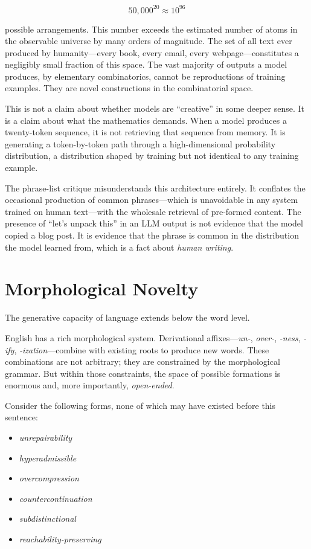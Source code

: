 \documentclass[12pt]{article}
\begin{document}
\[
50{,}000^{20} \approx 10^{96}
\]

\noindent possible arrangements. This number exceeds the estimated number of atoms in the observable universe by many orders of magnitude. The set of all text ever produced by humanity---every book, every email, every webpage---constitutes a negligibly small fraction of this space. The vast majority of outputs a model produces, by elementary combinatorics, cannot be reproductions of training examples. They are novel constructions in the combinatorial space.

This is not a claim about whether models are ``creative'' in some deeper sense. It is a claim about what the mathematics demands. When a model produces a twenty-token sequence, it is not retrieving that sequence from memory. It is generating a token-by-token path through a high-dimensional probability distribution, a distribution shaped by training but not identical to any training example.

The phrase-list critique misunderstands this architecture entirely. It conflates the occasional production of common phrases---which is unavoidable in any system trained on human text---with the wholesale retrieval of pre-formed content. The presence of ``let's unpack this'' in an LLM output is not evidence that the model copied a blog post. It is evidence that the phrase is common in the distribution the model learned from, which is a fact about \emph{human writing}.

\section{Morphological Novelty}

The generative capacity of language extends below the word level.

English has a rich morphological system. Derivational affixes---\textit{un-}, \textit{over-}, \textit{-ness}, \textit{-ify}, \textit{-ization}---combine with existing roots to produce new words. These combinations are not arbitrary; they are constrained by the morphological grammar. But within those constraints, the space of possible formations is enormous and, more importantly, \emph{open-ended}.

Consider the following forms, none of which may have existed before this sentence:

\begin{itemize}[noitemsep]
  \item \textit{unrepairability}
  \item \textit{hyperadmissible}
  \item \textit{overcompression}
  \item \textit{countercontinuation}
  \item \textit{subdistinctional}
  \item \textit{reachability-preserving}
\end{itemize}
\end{document}
